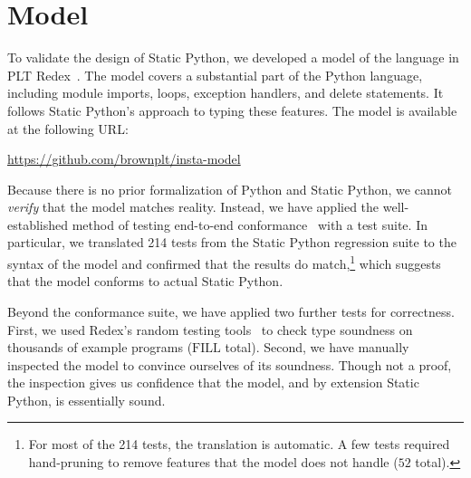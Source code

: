 \documentclass[english,cleveref,submission]{programming}
\newcommand{\SP}{Static Python}
\newcommand{\totalnum}[1]{$#1$ total}
\newcommand{\numSPtest}{214}
\begin{document}


\section{Model}
\label{s:model}

To validate the design of \SP{}, we developed a model of the language in PLT
Redex~\cite{kcdeffmrtf-popl-2012}.
The model covers a substantial part of the Python language, including
module imports, loops, exception handlers, and delete statements.
It follows \SP{}'s approach to typing these features.
The model is available at the following URL:

\smallskip
{\centering\url{https://github.com/brownplt/insta-model}}

Because there is no prior formalization of Python and \SP{}, we cannot
\emph{verify} that the model matches reality.
Instead, we have applied the well-established method of testing end-to-end
conformance~\cite{gsk-ecoop-2010,gclpk-dls-2012,pmmwplck-oopsla-2013,bcfgmnss-popl-2014,fgpssmds-popl-2016}
with a test suite.
In particular, we translated \numSPtest{} tests from the \SP{} regression suite to the
syntax of the model and confirmed that the results
do match,\footnote{For most of the \numSPtest{} tests, the translation is automatic.
  A few tests required hand-pruning to remove features that the model
  does not handle (\totalnum{52}).}
which suggests that the model conforms to actual \SP{}.

Beyond the conformance suite, we have applied two further tests for correctness.
First, we used Redex's random testing tools~\cite{kf-sfp-2009} to check
type soundness on thousands of example programs (\totalnum{\mbox{FILL}}).
Second, we have manually inspected the model to convince ourselves
of its soundness.
Though not a proof, the inspection gives us confidence that the model,
and by extension \SP{}, is essentially sound.
\end{document}
